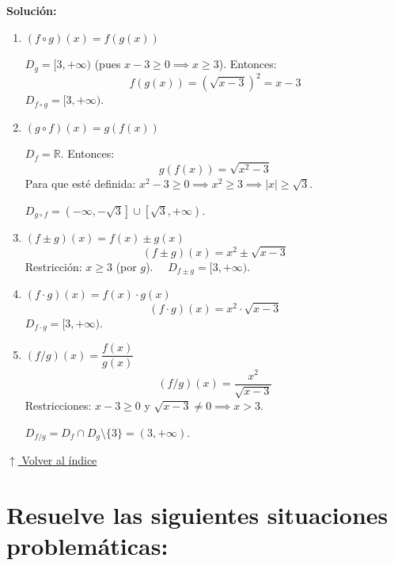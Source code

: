 \documentclass[12pt]{article}
\newcommand{\volverindice}{%
    \vspace{1em}%
    \begin{flushright}%
        \hyperlink{indice}{\small $\uparrow$ Volver al índice}%
    \end{flushright}%
}
\begin{document}
\begin{enumerate}[label=\alph*.-]
    \textbf{Solución:}
 
    \begin{enumerate}[label=\roman*.]
        \item \textbf{$(f \circ g)(x) = f(g(x))$}
        
        $D_g = [3, +\infty)$ (pues $x - 3 \geq 0 \implies x \geq 3$). Entonces:
        \[
        f(g(x)) = \left(\sqrt{x-3}\right)^2 = x - 3
        \]
        $D_{f \circ g} = [3, +\infty)$.
 
        \item \textbf{$(g \circ f)(x) = g(f(x))$}
        
        $D_f = \mathbb{R}$. Entonces:
        \[
        g(f(x)) = \sqrt{x^2 - 3}
        \]
        Para que esté definida: $x^2 - 3 \geq 0 \implies x^2 \geq 3 \implies |x| \geq \sqrt{3}$.
        
        $D_{g \circ f} = \left(-\infty, -\sqrt{3}\right] \cup \left[\sqrt{3}, +\infty\right)$.
 
        \item \textbf{$(f \pm g)(x) = f(x) \pm g(x)$}
        \[
        (f \pm g)(x) = x^2 \pm \sqrt{x - 3}
        \]
        Restricción: $x \geq 3$ (por $g$). $\quad D_{f \pm g} = [3, +\infty)$.
 
        \item \textbf{$(f \cdot g)(x) = f(x) \cdot g(x)$}
        \[
        (f \cdot g)(x) = x^2 \cdot \sqrt{x - 3}
        \]
        $D_{f \cdot g} = [3, +\infty)$.
 
        \item \textbf{$(f/g)(x) = \dfrac{f(x)}{g(x)}$}
        \[
        (f/g)(x) = \frac{x^2}{\sqrt{x-3}}
        \]
        Restricciones: $x - 3 \geq 0$ y $\sqrt{x-3} \neq 0 \implies x > 3$.
        
        $D_{f/g} = D_f \cap D_g \setminus \{3\} = (3, +\infty)$.
    \end{enumerate}
\end{enumerate}

\volverindice
\newpage

\section[Situaciones problemáticas]{Resuelve las siguientes situaciones problemáticas:}
 
\end{document}
